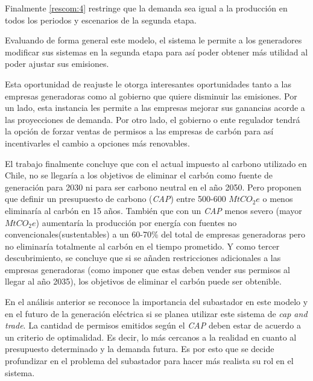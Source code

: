 Finalmente \ref{rescom:4} restringe que la demanda sea igual a la producción en todos los periodos y escenarios de la segunda etapa.
\vspace{2.5mm}

Evaluando de forma general este modelo, el sistema le permite a los generadores modificar sus sistemas en la segunda etapa para así poder obtener más utilidad al poder ajustar sus emisiones.
\vspace{2.5mm}

Esta oportunidad de reajuste le otorga interesantes oportunidades tanto a las empresas generadoras como al gobierno que quiere disminuir las emisiones. Por un lado, esta instancia les permite a las empresas mejorar sus ganancias acorde a las proyecciones de demanda. Por otro lado, el gobierno o ente regulador tendrá la opción de forzar ventas de permisos a las empresas de carbón para así incentivarles el cambio a opciones más renovables. 
\vspace{2.5mm}

El trabajo finalmente concluye que con el actual impuesto al carbono utilizado en Chile, no se llegaría a los objetivos de eliminar el carbón como fuente de generación para 2030 ni para ser carbono neutral en el año 2050. Pero proponen que definir un presupuesto de carbono (\textit{CAP}) entre 500-600 $MtCO_2 e$ o menos eliminaría al carbón en 15 años. También que con un \textit{CAP} menos severo (mayor $MtCO_2 e$) aumentaría la producción por energía con fuentes no convencionales(sustentables) a un 60-70\% del total de empresas generadoras pero no eliminaría totalmente al carbón en el tiempo prometido. Y como tercer descubrimiento, se concluye que si se añaden restricciones adicionales a las empresas generadoras (como imponer que estas deben vender sus permisos al llegar al año 2035), los objetivos de eliminar el carbón puede ser obtenible.
\vspace{2.5mm}

En el análisis anterior se reconoce la importancia del subastador en este modelo y en el futuro de la generación eléctrica si se planea utilizar este sistema de \textit{cap and trade}. La cantidad de permisos emitidos según el \textit{CAP} deben estar de acuerdo a un criterio de optimalidad. Es decir, lo más cercanos a la realidad en cuanto al presupuesto determinado y la demanda futura. Es por esto que se decide profundizar en el problema del subastador para hacer más realista su rol en el sistema.
\vspace{2.5mm}

